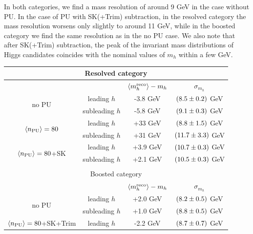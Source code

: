         In both categories,
        we find a mass resolution of around 9 GeV in the case
        without PU.
        In the case of PU
        with SK(+Trim) subtraction,
        in the resolved category the mass resolution
        worsens only slightly
        to around 11 GeV, while in the boosted category we find
        the same resolution as in the no PU case.
        We also note that after SK(+Trim) subtraction, the peak of
        the invariant mass distributions of Higgs candidates
        coincides with the nominal values of $m_h$ within a few GeV.

    \begin{table}[t]
      \centering
      \begin{tabular}{|c|c|c|c|}
        \hline
        \multicolumn{4}{|c|}{Resolved category}\\
        \hline
        \hline
        &   &   $\left\langle m_h^{\rm reco}\right\rangle-m_h$  &  $\sigma_{m_h}$  \\
              \hline
        \multirow{2}{*}{no PU}  & leading $h$  &  -3.8 GeV   & $\left( 8.5\pm 0.2\right)$ GeV   \\
          & subleading $h$   & -5.8 GeV  &  $\left( 9.1\pm 0.3\right)$ GeV \\
        \hline
          \multirow{2}{*}{$\left\langle n_{\rm PU}\right\rangle=80$}  & leading $h$  &  +33 GeV   & $\left( 8.8\pm 1.5\right)$ GeV   \\
          & subleading $h$   & +31 GeV  &  $\left( 11.7\pm 3.3\right)$ GeV \\
          \hline
            \multirow{2}{*}{$\left\langle n_{\rm PU}\right\rangle=80$+SK}  & leading $h$  &  +3.9 GeV   & $\left( 10.7\pm 0.3\right)$ GeV   \\
          & subleading $h$   & +2.1 GeV  &  $\left( 10.5\pm 0.3\right)$ GeV \\
            \hline
            \multicolumn{4}{c}{}\\
             \hline
        \multicolumn{4}{|c|}{Boosted category}\\
        \hline
        \hline
        &   &   $\left\langle m_h^{\rm reco}\right\rangle-m_h$  &  $\sigma_{m_h}$  \\
              \hline
        \multirow{2}{*}{no PU}  & leading $h$  &  +2.0 GeV   & $\left( 8.2\pm 0.5\right)$ GeV   \\
          & subleading $h$   & +1.0 GeV  &  $\left( 8.8\pm 0.5\right)$ GeV \\
        \hline
              \multirow{2}{*}{$\left\langle n_{\rm PU}\right\rangle=80$+SK+Trim}  & leading $h$  &  -2.2 GeV   & $\left( 8.7\pm 0.7\right)$ GeV   \\

\end{tabular}
\end{table}
